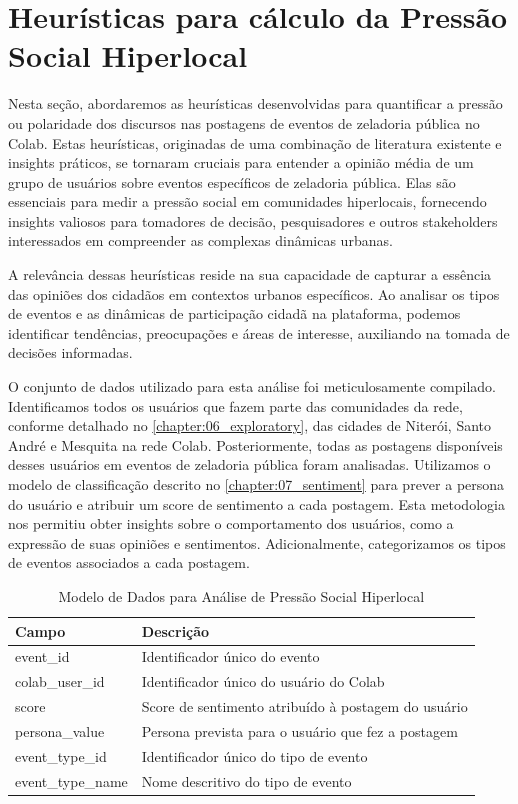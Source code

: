 \section{Heurísticas para cálculo da Pressão Social Hiperlocal}

Nesta seção, abordaremos as heurísticas desenvolvidas para quantificar a pressão ou polaridade dos discursos nas postagens de eventos de zeladoria pública no Colab. Estas heurísticas, originadas de uma combinação de literatura existente e insights práticos, se tornaram cruciais para entender a opinião média de um grupo de usuários sobre eventos específicos de zeladoria pública. Elas são essenciais para medir a pressão social em comunidades hiperlocais, fornecendo insights valiosos para tomadores de decisão, pesquisadores e outros stakeholders interessados em compreender as complexas dinâmicas urbanas.

A relevância dessas heurísticas reside na sua capacidade de capturar a essência das opiniões dos cidadãos em contextos urbanos específicos. Ao analisar os tipos de eventos e as dinâmicas de participação cidadã na plataforma, podemos identificar tendências, preocupações e áreas de interesse, auxiliando na tomada de decisões informadas.

O conjunto de dados utilizado para esta análise foi meticulosamente compilado. Identificamos todos os usuários que fazem parte das comunidades da rede, conforme detalhado no \autoref{chapter:06_exploratory}, das cidades de Niterói, Santo André e Mesquita na rede Colab. Posteriormente, todas as postagens disponíveis desses usuários em eventos de zeladoria pública foram analisadas. Utilizamos o modelo de classificação descrito no \autoref{chapter:07_sentiment} para prever a persona do usuário e atribuir um score de sentimento a cada postagem. Esta metodologia nos permitiu obter insights sobre o comportamento dos usuários, como a expressão de suas opiniões e sentimentos. Adicionalmente, categorizamos os tipos de eventos associados a cada postagem.

\begin{table}[htbp]
	\centering
	\caption{Modelo de Dados para Análise de Pressão Social Hiperlocal}
	\begin{tabular}{ll}
		\toprule
		\textbf{Campo}    & \textbf{Descrição}                                  \\
		\midrule
		event\_id         & Identificador único do evento                       \\
		colab\_user\_id   & Identificador único do usuário do Colab             \\
		score             & Score de sentimento atribuído à postagem do usuário \\
		persona\_value    & Persona prevista para o usuário que fez a postagem  \\
		event\_type\_id   & Identificador único do tipo de evento               \\
		event\_type\_name & Nome descritivo do tipo de evento                   \\
		\bottomrule
	\end{tabular}
	\label{tab:modelo-dados-barometro}
\end{table}

